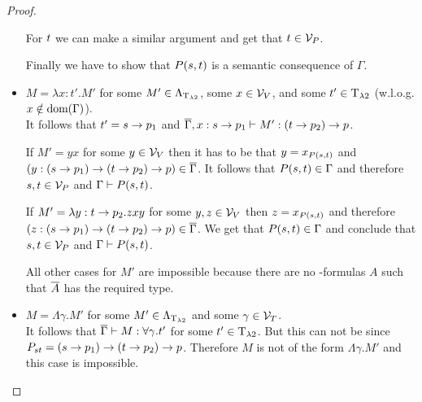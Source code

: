 \begin{proof}
\begin{itemize}
		For $\predTSnd$ we can make a similar argument and get that $\predTSnd\in\VarP$.
		
		Finally we have to show that $P(\predTFst,\predTSnd)$ is a semantic consequence of $\Gamma$.
		
		\begin{figure}[H]
			\centering
			
		\end{figure}
		
	\item[] \underline{$M=\lambda x:t'.M'$} for some $M'\in\Lambda_{\text{T}_{\lambda2}}$, some $x\in\mathcal{V}_V$, and some $t'\in\text{T}_{\lambda2}$ (w.l.o.g. $x\notin\text{dom}(\Gamma)$).\\
		It follows that $t'=\predTFst\to p_1$ and $\trans{\Gamma},x:\predTFst\to p_1\lambdaModels M':(\predTSnd\to p_2)\to p$.
		
		If $M'=yx$ for some $y\in\mathcal{V}_V$ then it has to be that $y=x_{P(\predTFst,\predTSnd)}$ and $(y:(\predTFst\to p_1)\to(\predTSnd\to p_2)\to p)\in\trans{\Gamma}$. It follows that $P(\predTFst,\predTSnd)\in\Gamma$ and therefore $\predTFst,\predTSnd\in\VarP$ and $\Gamma\PModels P(\predTFst,\predTSnd)$.
		
		If $M'=\lambda y:\predTSnd\to p_2.zxy$ for some $y,z\in\mathcal{V}_V$ then $z=x_{P(\predTFst,\predTSnd)}$ and therefore $(z:(\predTFst\to p_1)\to(\predTSnd\to p_2)\to p)\in\trans{\Gamma}$. We get that $P(\predTFst,\predTSnd)\in\Gamma$ and conclude that $\predTFst,\predTSnd\in\VarP$ and $\Gamma\PModels P(\predTFst,\predTSnd)$.
		
		All other cases for $M'$ are impossible because there are no \SysP-formulas $A$ such that $\overline{A}$ has the required type. 
	\item[] \underline{$M=\Lambda\gamma.M'$} for some $M'\in\Lambda_{\text{T}_{\lambda2}}$ and some $\gamma\in\mathcal{V}_T$.\\ %
		It follows that $\overline{\Gamma}\vdash M:\forall\gamma.t'$ for some $t'\in\text{T}_{\lambda2}$.
		But this can not be since $\code{P}{\predTFst}{\predTSnd}=(\predTFst\to p_1)\to(\predTSnd\to p_2)\to p$. Therefore $M$ is not of the form $\Lambda\gamma.M'$ and this case is impossible.


\end{itemize}
\end{proof}

